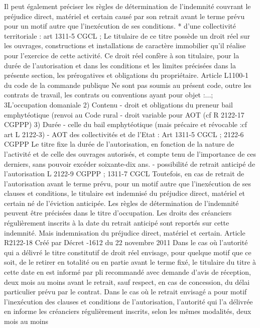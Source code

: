 \documentclass[11pt,a4paper]{report}
\begin{document}
Il peut également préciser les règles de détermination de l'indemnité couvrant le préjudice direct, matériel et
certain causé par son retrait avant le terme prévu pour un motif autre que l'inexécution de ses conditions.
* d’une collectivité territoriale : art 1311-5 CGCL ; Le titulaire de ce titre possède un droit réel sur les
ouvrages, constructions et installations de caractère immobilier qu'il réalise pour l'exercice de cette activité.
Ce droit réel confère à son titulaire, pour la durée de l'autorisation et dans les conditions et les limites
précisées dans la présente section, les prérogatives et obligations du propriétaire.
Article L1100-1 du code de la commande publique
Ne sont pas soumis au présent code, outre les contrats de travail, les contrats ou conventions ayant pour objet
:...;
3\degre  L'occupation domaniale
2\degre ) Contenu
- droit et obligations du preneur bail emphytéotique (renvoi au Code rural
- droit variable pour AOT (cf R 2122-17 CGPPP)
3\degre ) Durée
- celle du bail emphytéotique (mais précaire et révocable :cf art L 2122-3)
- AOT des collectivités et de l’Etat : Art 1311-5 CGCL ; 2122-6 CGPPP Le titre fixe la durée de l'autorisation,
en fonction de la nature de l'activité et de celle des ouvrages autorisés, et compte tenu de l'importance de ces
derniers, sans pouvoir excéder soixante-dix ans.
- possibilité de retrait anticipé de l’autorisation L 2122-9 CGPPP ; 1311-7 CGCL
Toutefois, en cas de retrait de l'autorisation avant le terme prévu, pour un motif autre que l'inexécution de ses
clauses et conditions, le titulaire est indemnisé du préjudice direct, matériel et certain né de l'éviction anticipée.
Les règles de détermination de l'indemnité peuvent être précisées dans le titre d'occupation. Les droits des
créanciers régulièrement inscrits à la date du retrait anticipé sont reportés sur cette indemnité.
Mais indemnisation du préjudice direct, matériel et certain.
Article R2122-18 Créé par Décret -1612 du 22 novembre 2011 Dans le cas où l'autorité qui a délivré le
titre constitutif de droit réel envisage, pour quelque motif que ce soit, de le retirer en totalité ou en partie avant
le terme fixé, le titulaire du titre à cette date en est informé par pli recommandé avec demande d'avis de
réception, deux mois au moins avant le retrait, sauf respect, en cas de concession, du délai particulier prévu par
le contrat.
Dans le cas où le retrait envisagé a pour motif l'inexécution des clauses et conditions de l'autorisation, l'autorité
qui l'a délivrée en informe les créanciers régulièrement inscrits, selon les mêmes modalités, deux mois au moins
\end{document}
